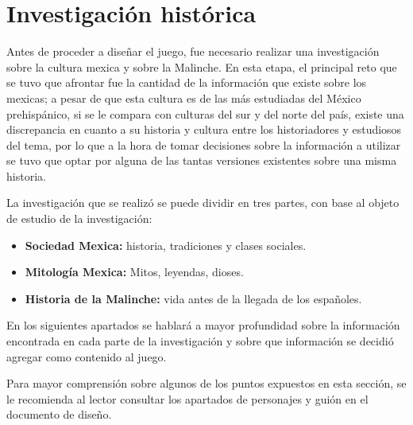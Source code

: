 \section{Investigación histórica}
Antes de proceder a diseñar el juego, fue necesario realizar una investigación
sobre la cultura mexica y sobre la Malinche. En esta etapa, el principal reto 
que se tuvo que afrontar fue la cantidad de la información que existe sobre 
los mexicas; a pesar de que esta cultura es de las más estudiadas del México
prehispánico, si se le compara con culturas del sur y del norte del país, existe 
una discrepancia en cuanto a su historia y cultura entre los historiadores y 
estudiosos del tema, por lo que a la hora de tomar decisiones sobre la información 
a utilizar se tuvo que optar por alguna de las tantas versiones existentes sobre 
una misma historia.
	\\
	\par
	La investigación que se realizó se puede dividir en tres partes, con base al 
	objeto de estudio de la investigación:
	\begin{itemize}
		\item \textbf{Sociedad Mexica:} historia, tradiciones y clases sociales.
		\item \textbf{Mitología Mexica:} Mitos, leyendas, dioses.
		\item \textbf{Historia de la Malinche:} vida antes de la llegada de los 
		españoles.
	\end{itemize}
	
	En los siguientes apartados se hablará a mayor profundidad sobre la información 
	encontrada en cada parte de la investigación y sobre que información se decidió
	agregar como contenido al juego.
	\\
	\par
	Para mayor comprensión sobre algunos de los puntos expuestos en esta 
	sección, se le recomienda al lector consultar los apartados de personajes y 
	guión en el documento de diseño.
	
